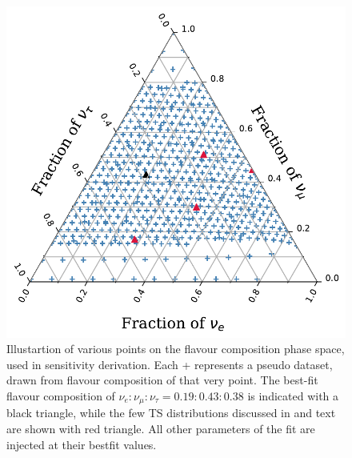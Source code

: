 \begin{figure}[h]
    
    \includegraphics{./figures/results/trials_points.pdf}


    \caption{Illustartion of various points on the flavour composition phase space, used in sensitivity derivation. Each + represents a pseudo dataset, drawn from flavour composition of that very point. The best-fit flavour composition of $\nu_e:\nu_{\mu}:\nu_{\tau} = 0.19:0.43:0.38$ is indicated with a black triangle, while the few TS distributions discussed in  and text are shown with red triangle. All other parameters of the fit are injected at their bestfit values.}
\end{figure}

